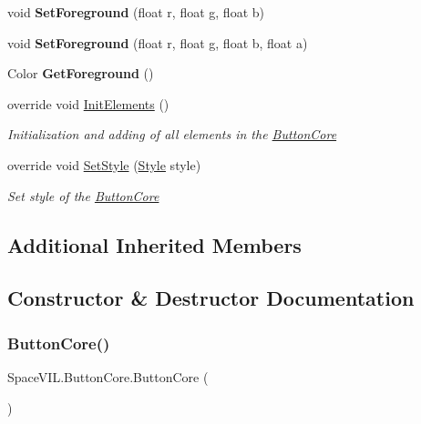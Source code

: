 \begin{DoxyCompactItemize}
void {\bfseries Set\+Foreground} (float r, float g, float b)
\item 
\mbox{\label{class_space_v_i_l_1_1_button_core_adc86dbdc35f4fefc84b2598d7fa4f1af}} 
void {\bfseries Set\+Foreground} (float r, float g, float b, float a)
\item 
\mbox{\label{class_space_v_i_l_1_1_button_core_a73cabca45794e5e8bcc5797ea26c71cb}} 
Color {\bfseries Get\+Foreground} ()
\item 
override void \mbox{\hyperlink{class_space_v_i_l_1_1_button_core_a4321848c2398d6e08da3bfea649e3e31}{Init\+Elements}} ()
\begin{DoxyCompactList}\small\item\em Initialization and adding of all elements in the \mbox{\hyperlink{class_space_v_i_l_1_1_button_core}{Button\+Core}} \end{DoxyCompactList}\item 
override void \mbox{\hyperlink{class_space_v_i_l_1_1_button_core_adf846a4e98ee6bbf8722232f10622231}{Set\+Style}} (\mbox{\hyperlink{class_space_v_i_l_1_1_decorations_1_1_style}{Style}} style)
\begin{DoxyCompactList}\small\item\em Set style of the \mbox{\hyperlink{class_space_v_i_l_1_1_button_core}{Button\+Core}} \end{DoxyCompactList}\end{DoxyCompactItemize}
\subsection*{Additional Inherited Members}


\subsection{Constructor \& Destructor Documentation}
\mbox{\label{class_space_v_i_l_1_1_button_core_ab1139f0c4796d74ef4444f79626d751c}} 
\subsubsection{\texorpdfstring{Button\+Core()}{ButtonCore()}\hspace{0.1cm}{\footnotesize\ttfamily [1/2]}}
{\footnotesize\ttfamily Space\+V\+I\+L.\+Button\+Core.\+Button\+Core (\begin{DoxyParamCaption}{ }\end{DoxyParamCaption})\hspace{0.3cm}{\ttfamily [inline]}}



